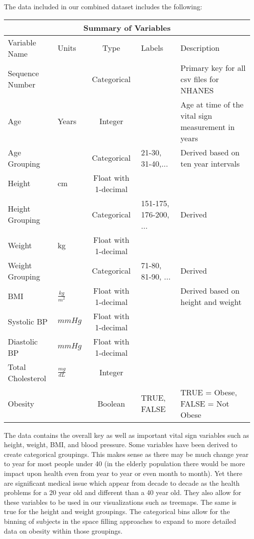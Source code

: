\documentclass[12pt]{article}
\numberwithin{figure}{section}
\begin{document}
The data included in our combined dataset includes the following:
\begin{longtable}{|p{5cm}|p{1.4cm}|c|p{2cm}|p{6.5cm}|}
\hline
\multicolumn{5}{|c|}{Summary of Variables}\\
\hline
Variable Name&Units&Type&Labels&Description\\
\hline
Sequence Number &&Categorical& & Primary key for all csv files for NHANES\\
\hline
Age &Years&Integer& & Age at time of the vital sign measurement in years\\
\hline
Age Grouping&&Categorical&21-30, 31-40,... &Derived based on ten year intervals\\
\hline
Height&cm&Float with 1-decimal& & \\
\hline
Height Grouping&&Categorical&151-175, 176-200, ...& Derived\\
\hline
Weight&kg&Float with 1-decimal&  & \\
\hline
Weight Grouping&&Categorical&71-80, 81-90, ...& Derived\\
\hline
BMI&$\frac{kg}{m^2}$&Float with 1-decimal&  &Derived based on height and weight \\
\hline
Systolic BP&$mmHg$&Float with 1-decimal&  & \\
\hline
Diastolic BP&$mmHg$&Float with 1-decimal&  & \\
\hline
Total Cholesterol&$\frac{mg}{dL}$&Integer&  & \\
\hline
Obesity&&Boolean& TRUE, FALSE &TRUE = Obese, FALSE = Not Obese \\
\hline
\end{longtable}

The data contains the overall key as well as important vital sign variables such as height, weight, BMI, and blood pressure.  Some variables have been derived to create categorical groupings.  This makes sense as there may be much change year to year for most people under 40 (in the elderly population there would be more impact upon health even from year to year or even month to month).  Yet there are significant medical issue which appear from decade to decade as the health problems for a 20 year old and different than a 40 year old.  They also allow for these variables to be used in our visualizations such as treemaps.  The same is true for the height and weight groupings.  The categorical bins allow for the binning of subjects in the space filling approaches to expand to more detailed data on obesity within those groupings.
\end{document}
